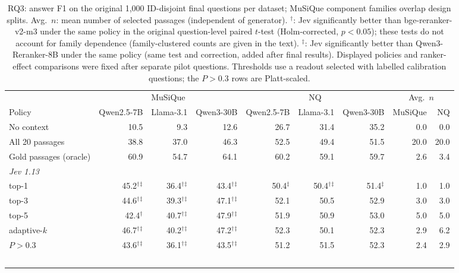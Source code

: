\begin{table}[t]
\centering
\footnotesize
\setlength{\tabcolsep}{4pt}
\caption{RQ3: answer F1 on the original 1{,}000 ID-disjoint final questions per dataset; MuSiQue component families overlap design splits. Avg.\ $n$: mean number of selected passages (independent of generator). $^\dagger$: Jev significantly better than bge-reranker-v2-m3 under the same policy in the original question-level paired $t$-test (Holm-corrected, $p<0.05$); these tests do not account for family dependence (family-clustered counts are given in the text). $^\ddagger$: Jev significantly better than Qwen3-Reranker-8B under the same policy (same test and correction, added after final results). Displayed policies and ranker-effect comparisons were fixed after separate pilot questions. Thresholds use a readout selected with labelled calibration questions; the $P>0.3$ rows are Platt-scaled.}
\label{tab:rag}
\begin{tabular}{lrrrrrrrr}
\toprule
 & \multicolumn{3}{c}{MuSiQue} & \multicolumn{3}{c}{NQ} & \multicolumn{2}{c}{Avg.\ $n$} \\
Policy & Qwen2.5-7B & Llama-3.1 & Qwen3-30B & Qwen2.5-7B & Llama-3.1 & Qwen3-30B & MuSiQue & NQ \\
\midrule
No context & 10.5 & 9.3 & 12.6 & 26.7 & 31.4 & 35.2 & 0.0 & 0.0 \\
All 20 passages & 38.8 & 37.0 & 46.3 & 52.5 & 49.4 & 51.5 & 20.0 & 20.0 \\
Gold passages (oracle) & 60.9 & 54.7 & 64.1 & 60.2 & 59.1 & 59.7 & 2.6 & 3.4 \\
\multicolumn{9}{l}{\textit{Jev 1.13}} \\
\quad top-1 & 45.2$^\dagger$$^\ddagger$ & 36.4$^\dagger$$^\ddagger$ & 43.4$^\dagger$$^\ddagger$ & 50.4$^\ddagger$ & 50.4$^\dagger$$^\ddagger$ & 51.4$^\ddagger$ & 1.0 & 1.0 \\
\quad top-3 & 44.6$^\dagger$$^\ddagger$ & 39.3$^\dagger$$^\ddagger$ & 47.1$^\dagger$$^\ddagger$ & 52.1 & 50.5 & 52.9 & 3.0 & 3.0 \\
\quad top-5 & 42.4$^\dagger$ & 40.7$^\dagger$$^\ddagger$ & 47.9$^\dagger$$^\ddagger$ & 51.9 & 50.9 & 53.0 & 5.0 & 5.0 \\
\quad adaptive-$k$ & 46.7$^\dagger$$^\ddagger$ & 40.2$^\dagger$$^\ddagger$ & 47.2$^\dagger$$^\ddagger$ & 52.3 & 50.1 & 52.3 & 2.9 & 6.2 \\
\quad $P>0.3$ & 43.6$^\dagger$$^\ddagger$ & 36.1$^\dagger$$^\ddagger$ & 43.5$^\dagger$$^\ddagger$ & 51.2 & 51.5 & 52.3 & 2.4 & 2.9 \\
$$
\end{tabular}
\end{table}
